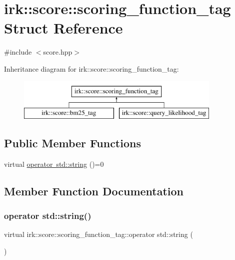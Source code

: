 \hypertarget{structirk_1_1score_1_1scoring__function__tag}{}\section{irk\+:\+:score\+:\+:scoring\+\_\+function\+\_\+tag Struct Reference}
\label{structirk_1_1score_1_1scoring__function__tag}


{\ttfamily \#include $<$score.\+hpp$>$}

Inheritance diagram for irk\+:\+:score\+:\+:scoring\+\_\+function\+\_\+tag\+:\begin{figure}[H]
\begin{center}
\leavevmode
\includegraphics[height=2.000000cm]{structirk_1_1score_1_1scoring__function__tag}
\end{center}
\end{figure}
\subsection*{Public Member Functions}
\begin{DoxyCompactItemize}
\item 
virtual \mbox{\hyperlink{structirk_1_1score_1_1scoring__function__tag_a718047dd6d5a9edd7b76ec55f2599c49}{operator std\+::string}} ()=0
\end{DoxyCompactItemize}


\subsection{Member Function Documentation}
\mbox{\label{structirk_1_1score_1_1scoring__function__tag_a718047dd6d5a9edd7b76ec55f2599c49}} 
\subsubsection{\texorpdfstring{operator std\+::string()}{operator std::string()}}
{\footnotesize\ttfamily virtual irk\+::score\+::scoring\+\_\+function\+\_\+tag\+::operator std\+::string (\begin{DoxyParamCaption}{ }\end{DoxyParamCaption})\hspace{0.3cm}{\ttfamily [pure virtual]}}



